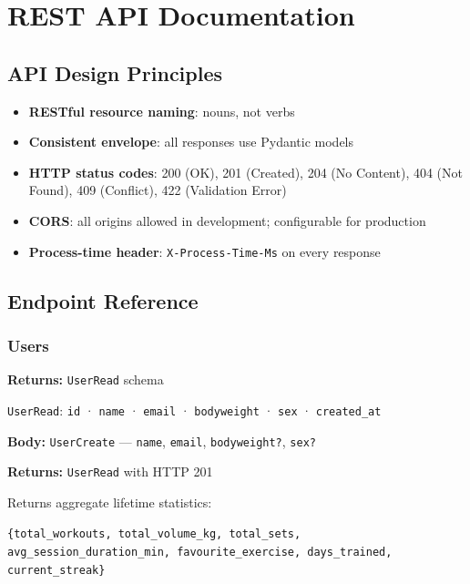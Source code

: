 \documentclass[12pt,a4paper]{report}
\begin{document}
\chapter{REST API Documentation}

\section{API Design Principles}

\begin{itemize}
  \item \textbf{RESTful resource naming}: nouns, not verbs
  \item \textbf{Consistent envelope}: all responses use Pydantic models
  \item \textbf{HTTP status codes}: 200 (OK), 201 (Created), 204 (No Content),
        404 (Not Found), 409 (Conflict), 422 (Validation Error)
  \item \textbf{CORS}: all origins allowed in development; configurable for production
  \item \textbf{Process-time header}: \texttt{X-Process-Time-Ms} on every response
\end{itemize}

\section{Endpoint Reference}

\subsection{Users}

\begin{apibox}
\textbf{Returns:} \texttt{UserRead} schema

\texttt{UserRead}: \texttt{id} · \texttt{name} · \texttt{email} · \texttt{bodyweight} · \texttt{sex} · \texttt{created\_at}
\end{apibox}

\begin{apibox}
\textbf{Body:} \texttt{UserCreate} — \texttt{name}, \texttt{email}, \texttt{bodyweight?}, \texttt{sex?}

\textbf{Returns:} \texttt{UserRead} with HTTP 201
\end{apibox}

\begin{apibox}
Returns aggregate lifetime statistics:

\texttt{\{total\_workouts, total\_volume\_kg, total\_sets, avg\_session\_duration\_min, favourite\_exercise, days\_trained, current\_streak\}}
\end{apibox}
\end{document}

